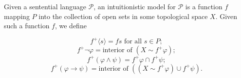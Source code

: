 Given a sentential language $\mathcal{P}$, an intuitionistic model for $\mathcal{P}$ is a function $f$ mapping $P$ into the collection of open sets in some topological space $X$. Given such a function $f$, we define

$$f^{+} \langle s \rangle = fs \text{ for all } s \in P;$$
$$f^{+} \neg \varphi = \text{interior of } (X \sim f^{+} \varphi);$$
$$f^{+} (\varphi \wedge \psi) = f^{+} \varphi \cap f^{+} \psi;$$
$$f^{+} (\varphi \rightarrow \psi) = \text{interior of } ((X \sim f^{+} \varphi) \cup f^{+} \psi).$$
